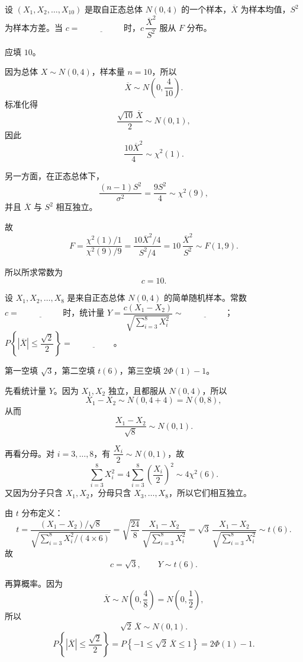 ﻿\documentclass[lang=cn,11pt]{elegantbook}
\begin{document}
\begin{exercise}\label{exer:6-f-xbar}
设 \((X_1, X_2, \dots, X_{10})\) 是取自正态总体 \(N(0, 4)\) 的一个样本，\(\overline{X}\) 为样本均值，\(S^2\) 为样本方差。当 \(c =\,\underline{\hspace{2cm}}\) 时，\(c\,\dfrac{\overline{X}^2}{S^2}\) 服从 \(F\) 分布。
\end{exercise}
\begin{solution}
应填 \(10\)。

因为总体 \(X\sim N(0,4)\)，样本量 \(n=10\)，所以
\[
\overline{X}\sim N\!\left(0,\frac{4}{10}\right).
\]
标准化得
\[
\frac{\sqrt{10}\,\overline{X}}{2}\sim N(0,1),
\]
因此
\[
\frac{10\overline{X}^2}{4}\sim\chi^2(1).
\]

另一方面，在正态总体下，
\[
\frac{(n-1)S^2}{\sigma^2}=\frac{9S^2}{4}\sim\chi^2(9),
\]
并且 \(\overline{X}\) 与 \(S^2\) 相互独立。

故
\[
F = \frac{\chi^2(1)/1}{\chi^2(9)/9} = \frac{10\overline{X}^2/4}{S^2/4} = 10\,\frac{\overline{X}^2}{S^2} \sim F(1, 9).
\]

所以所求常数为
\[
c=10.
\]
\end{solution}

\begin{exercise}\label{exer:6-t-prob}
设 \(X_1, X_2, \dots, X_8\) 是来自正态总体 \(N(0, 4)\) 的简单随机样本。常数 \(c =\,\underline{\hspace{2cm}}\) 时，统计量 \(Y = \dfrac{c(X_1-X_2)}{\sqrt{\sum_{i=3}^{8}X_i^2}} \sim\,\underline{\hspace{2cm}}\)；\(P\!\left\{|\overline{X}| \leq \dfrac{\sqrt{2}}{2}\right\} =\,\underline{\hspace{2cm}}\)。
\end{exercise}
\begin{solution}
第一空填 \(\sqrt{3}\)，第二空填 \(t(6)\)，第三空填 \(2\Phi(1)-1\)。

先看统计量 \(Y\)。因为 \(X_1,X_2\) 独立，且都服从 \(N(0,4)\)，所以
\[
X_1-X_2\sim N(0,4+4)=N(0,8),
\]
从而
\[
\frac{X_1-X_2}{\sqrt{8}}\sim N(0,1).
\]

再看分母。对 \(i=3,\dots,8\)，有 \(\dfrac{X_i}{2}\sim N(0,1)\)，故
\[
\sum_{i=3}^{8}X_i^2
=4\sum_{i=3}^{8}\left(\frac{X_i}{2}\right)^2
\sim 4\chi^2(6).
\]
又因为分子只含 \(X_1,X_2\)，分母只含 \(X_3,\dots,X_8\)，所以它们相互独立。

由 \(t\) 分布定义：
\[
t = \frac{(X_1-X_2)/\sqrt{8}}{\sqrt{\sum_{i=3}^{8}X_i^2/(4 \times 6)}} = \sqrt{\frac{24}{8}}\,\frac{X_1-X_2}{\sqrt{\sum_{i=3}^{8}X_i^2}} = \sqrt{3}\,\frac{X_1-X_2}{\sqrt{\sum_{i=3}^{8}X_i^2}} \sim t(6).
\]
故
\[
c=\sqrt{3},\qquad Y\sim t(6).
\]

再算概率。因为
\[
\overline{X}\sim N\!\left(0,\frac{4}{8}\right)=N\!\left(0,\frac12\right),
\]
所以
\[
\sqrt{2}\,\overline{X}\sim N(0,1).
\]
\[
P\!\left\{|\overline{X}| \leq \frac{\sqrt{2}}{2}\right\} = P\!\left\{-1 \leq \sqrt{2}\,\overline{X} \leq 1\right\} = 2\Phi(1)-1.
\]
\end{solution}
\end{document}
